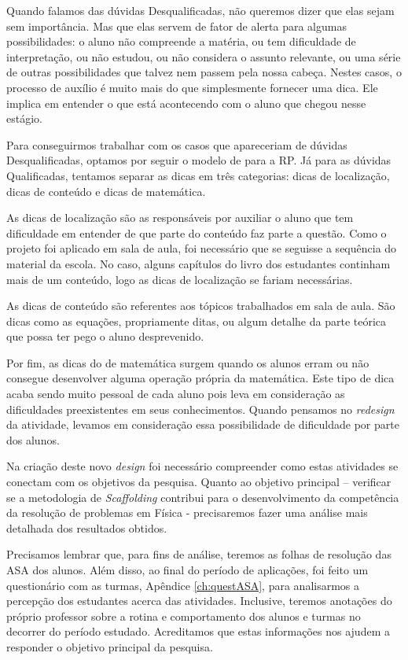 Quando falamos das dúvidas Desqualificadas, não queremos dizer que elas sejam sem importância. Mas que elas servem de fator de alerta para algumas possibilidades: o aluno não compreende a matéria, ou tem dificuldade de interpretação, ou não estudou, ou não considera o assunto relevante, ou uma série de outras possibilidades que talvez nem passem pela nossa cabeça. Nestes casos, o processo de auxílio é muito mais do que simplesmente fornecer uma dica. Ele implica em entender o que está acontecendo com o aluno que chegou nesse estágio. 

Para conseguirmos trabalhar com os casos que apareceriam de dúvidas Desqualificadas, optamos por seguir o modelo de  para a RP. Já para as dúvidas Qualificadas, tentamos separar as dicas em três categorias: dicas de localização, dicas de conteúdo e dicas de matemática. 

As dicas de localização são as responsáveis por auxiliar o aluno que tem dificuldade em entender de que parte do conteúdo faz parte a questão. Como o projeto foi aplicado em sala de aula, foi necessário que se seguisse a sequência do material da escola. No caso, alguns capítulos do livro dos estudantes continham mais de um conteúdo, logo as dicas de localização se fariam necessárias. 

As dicas de conteúdo são referentes aos tópicos trabalhados em sala de aula. São dicas como as equações, propriamente ditas, ou algum detalhe da parte teórica que possa ter pego o aluno desprevenido. 

Por fim, as dicas do de matemática surgem quando os alunos erram ou não consegue desenvolver alguma operação própria da matemática. Este tipo de dica acaba sendo muito pessoal de cada aluno pois leva em consideração as dificuldades preexistentes em seus conhecimentos. Quando pensamos no \textit{redesign} da atividade, levamos em consideração essa possibilidade de dificuldade por parte dos alunos.   

Na criação deste novo \textit{design} foi necessário compreender como estas atividades se conectam com os objetivos da pesquisa. Quanto ao objetivo principal – verificar se a metodologia de \textit{Scaffolding} contribui para o desenvolvimento da competência da resolução de problemas em Física - precisaremos fazer uma análise mais detalhada dos resultados obtidos. 

Precisamos lembrar que, para fins de análise, teremos as folhas de resolução das ASA dos alunos. Além disso, ao final do período de aplicações, foi feito um questionário com as turmas, Apêndice \ref{ch:questASA}, para analisarmos a percepção dos estudantes acerca das atividades. Inclusive, teremos anotações do próprio professor sobre a rotina e comportamento dos alunos e turmas no decorrer do período estudado. Acreditamos que estas informações nos ajudem a responder o objetivo principal da pesquisa.   

